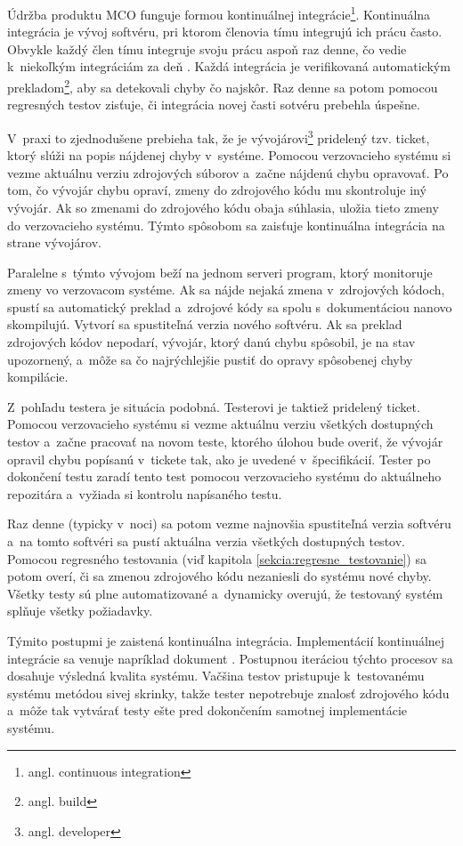 Údržba produktu MCO funguje formou kontinuálnej 
integrácie\footnote{angl. continuous integration}.
Kontinuálna integrácia je vývoj softvéru, pri ktorom členovia tímu integrujú
ich prácu často. Obvykle každý člen tímu integruje svoju prácu aspoň 
raz denne, čo vedie k~niekoľkým integráciám za deň 
\cite{Continuous_integration}.
Každá integrácia je verifikovaná automatickým 
prekladom\footnote{angl. build}, aby sa detekovali chyby čo najskôr. 
Raz denne sa potom pomocou regresných testov zisťuje,
či integrácia novej časti sotvéru prebehla úspešne.

V~praxi to zjednodušene prebieha tak, že je vývojárovi\footnote{angl. developer}
pridelený tzv. ticket, ktorý slúži na popis nájdenej chyby v~systéme. 
Pomocou verzovacieho systému si vezme aktuálnu verziu zdrojových súborov 
a~začne nájdenú chybu opravovať.
Po tom, čo vývojár chybu opraví, zmeny do zdrojového kódu mu skontroluje 
iný vývojár. Ak so zmenami do zdrojového kódu obaja súhlasia, uložia 
tieto zmeny do verzovacieho systému. Týmto spôsobom sa zaisťuje 
kontinuálna integrácia na strane vývojárov.

Paralelne s~týmto vývojom beží na jednom serveri program, ktorý 
monitoruje zmeny vo verzovacom systéme. Ak sa nájde nejaká zmena 
v~zdrojových kódoch, spustí sa automatický preklad a~zdrojové kódy sa 
spolu s~dokumentáciou nanovo skompilujú. Vytvorí sa spustiteľná verzia 
nového softvéru. Ak sa preklad zdrojových kódov nepodarí, vývojár, ktorý 
danú chybu spôsobil, je na stav upozornený, a~môže sa čo najrýchlejšie 
pustiť do opravy spôsobenej chyby kompilácie.

Z~pohľadu testera je situácia podobná. Testerovi je taktiež pridelený 
ticket. Pomocou verzovacieho systému si vezme aktuálnu verziu
všetkých dostupných testov a~začne pracovať na novom teste, ktorého úlohou bude 
overiť, že vývojár opravil chybu popísanú v~tickete tak, ako je 
uvedené v~špecifikácií.
Tester po dokončení testu zaradí tento test pomocou verzovacieho 
systému do aktuálneho repozitára a~vyžiada si kontrolu napísaného testu. 

Raz denne (typicky v~noci) sa potom vezme najnovšia spustiteľná verzia 
softvéru a~na tomto softvéri sa pustí aktuálna verzia všetkých dostupných 
testov. Pomocou regresného testovania 
(viď kapitola \ref{sekcia:regresne_testovanie}) sa potom overí, či sa 
zmenou zdrojového kódu nezaniesli do systému nové chyby. 
Všetky testy sú plne automatizované a~dynamicky overujú, že testovaný 
systém splňuje všetky požiadavky.

Týmito postupmi je zaistená kontinuálna integrácia. 
Implementácií kontinuálnej integrácie sa venuje napríklad dokument 
\cite{Continuous_integration_implementation}. 
Postupnou iteráciou týchto procesov sa dosahuje výsledná kvalita systému. 
Vačšina testov pristupuje k~testovanému systému metódou sivej skrinky, 
takže tester nepotrebuje znalosť zdrojového kódu a~môže tak vytvárať 
testy ešte pred dokončením samotnej implementácie systému. 

